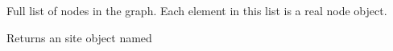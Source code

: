 \documentclass[letterpaper,10pt,english]{sphinxmanual}
\begin{document}
\begin{fulllineitems}
\begin{fulllineitems}
\end{fulllineitems}


\begin{fulllineitems}
\label{\detokenize{scripting:Graph.edge_list}}
Full list of nodes in the graph. Each element in this list is a real node object.

\end{fulllineitems}


\begin{fulllineitems}
\label{\detokenize{scripting:Graph.getSite}}
Returns an site object named 

\end{fulllineitems}


\end{fulllineitems}




\renewcommand{\indexname}{Index}
\printindex
\end{document}
